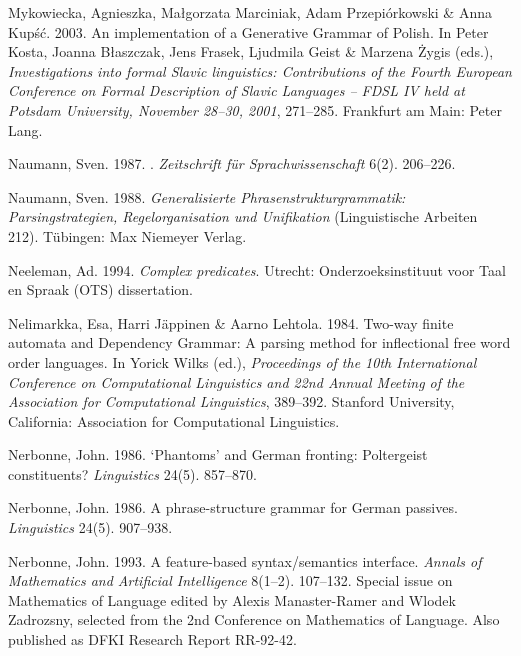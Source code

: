 \begin{thebibliography}{1420}
Mykowiecka, Agnieszka, Ma{\l}gorzata Marciniak, Adam Przepi{\'o}rkowski \& Anna
  Kup{\'s}{\'c}. 2003.
\newblock An implementation of a {Generative Grammar} of {Polish}.
\newblock In Peter Kosta, Joanna B{\l}aszczak, Jens Frasek, Ljudmila Geist \&
  Marzena {\.Z}ygis (eds.), \emph{Investigations into formal {Slavic}
  linguistics: {Contributions of the Fourth European Conference on Formal
  Description of Slavic Languages -- FDSL IV} held at {Potsdam University,
  November} 28--30, 2001}, 271--285. Frankfurt am Main: Peter Lang.

Naumann, Sven. 1987.
.
\newblock \emph{Zeitschrift f{\"u}r Sprachwissenschaft} 6(2). 206--226.

Naumann, Sven. 1988.
\newblock \emph{{Generalisierte Phrasenstrukturgrammatik: Parsingstrategien,
  Regelorganisation und Unifikation}} (Linguistische Arbeiten 212).
\newblock T{\"u}bingen: Max Niemeyer Verlag.

Neeleman, Ad. 1994.
\newblock \emph{Complex predicates}.
\newblock Utrecht: Onderzoeksinstituut voor Taal en Spraak (OTS) dissertation.

Nelimarkka, Esa, Harri J{\"a}ppinen \& Aarno Lehtola. 1984.
\newblock Two-way finite automata and {Dependency Grammar}: {A} parsing method
  for inflectional free word order languages.
\newblock In Yorick Wilks (ed.), \emph{Proceedings of the {10th International
  Conference on Computational Linguistics and 22nd Annual Meeting of the
  Association for Computational Linguistics}}, 389--392. Stanford University,
  California: Association for Computational Linguistics.

Nerbonne, John. 1986{}.
\newblock `{Phantoms}' and {German} fronting: {Poltergeist} constituents?
\newblock \emph{Linguistics} 24(5). 857--870.

Nerbonne, John. 1986{}.
\newblock A phrase-structure grammar for {German} passives.
\newblock \emph{Linguistics} 24(5). 907--938.

Nerbonne, John. 1993.
\newblock A feature-based syntax/semantics interface.
\newblock \emph{Annals of Mathematics and Artificial Intelligence} 8(1--2).
  107--132.
\newblock Special issue on Mathematics of Language edited by {Alexis
  Manaster-Ramer and Wlodek Zadrozsny}, selected from the {2nd Conference on
  Mathematics of Language. Also} published as {DFKI Research Report RR-92-42}.


\end{thebibliography}
